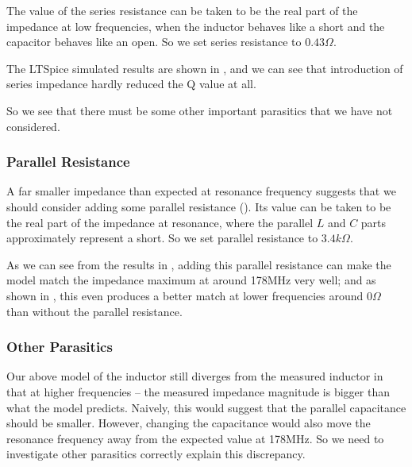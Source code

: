 \documentclass{article}
\begin{document}
The value of the series resistance can be taken to be the real part of the impedance at low frequencies, when the inductor behaves like a short and the capacitor behaves like an open.
So we set series resistance to $0.43\Omega$.

The LTSpice simulated results are shown in , and we can see that introduction of series impedance hardly reduced the Q value at all.

So we see that there must be some other important parasitics that we have not considered.

\subsubsection{Parallel Resistance}

A far smaller impedance than expected at resonance frequency suggests that we should consider adding some parallel resistance ().
Its value can be taken to be the real part of the impedance at resonance, where the parallel $L$ and $C$ parts approximately represent a short.
So we set parallel resistance to $3.4k\Omega$.

As we can see from the results in , adding this parallel resistance can make the model match the impedance maximum at around 178MHz very well;
and as shown in , this even produces a better match at lower frequencies around $0\Omega$ than without the parallel resistance.

\subsubsection{Other Parasitics}
Our above model of the inductor still diverges from the measured inductor in that at higher frequencies -- the measured impedance magnitude is bigger than what the model predicts.
Naively, this would suggest that the parallel capacitance should be smaller.
However, changing the capacitance would also move the resonance frequency away from the expected value at 178MHz.
So we need to investigate other parasitics correctly explain this discrepancy.
\end{document}
